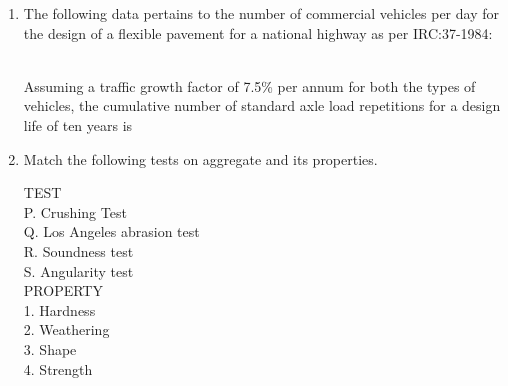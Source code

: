 \documentclass[journal,12pt,onecolumn]{IEEEtran}
\theoremstyle{remark}
\begin{document}
\begin{enumerate}
\begin{enumerate}
\end{enumerate}
\item The following data pertains to the number of commercial vehicles per day for the design of a flexible pavement for a national highway as per IRC:37-1984:\\
\begin{table}[h]
    \centering
    
\end{table}\\
Assuming a traffic growth factor of 7.5\% per annum for both the types of vehicles, the cumulative number of standard axle load repetitions  for a design life of ten years is
\begin{enumerate}
\end{enumerate}
\item Match the following tests on aggregate and its properties.
\begin{multicols}{2}
TEST\\
P. Crushing Test\\
Q. Los Angeles abrasion test\\
R. Soundness test\\
S. Angularity test\\
PROPERTY\\
1. Hardness\\
2. Weathering\\
3. Shape\\
4. Strength
\end{multicols}
\begin{enumerate}
\end{enumerate}
\end{enumerate}
\end{document}
